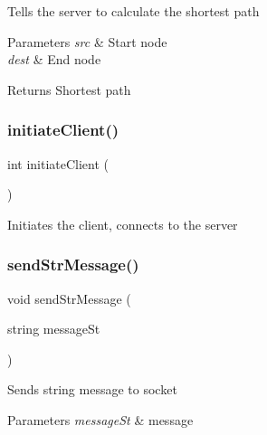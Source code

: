 Tells the server to calculate the shortest path 
\begin{DoxyParams}{Parameters}
{\em src} & Start node \\
\hline
{\em dest} & End node \\
\hline
\end{DoxyParams}
\begin{DoxyReturn}{Returns}
Shortest path 
\end{DoxyReturn}
\mbox{\label{client_8h_a9bdb5cb71771f3cf029e66d99bdbbeca}} 
\subsubsection{initiate\+Client()}
{\footnotesize\ttfamily int initiate\+Client (\begin{DoxyParamCaption}{ }\end{DoxyParamCaption})}

Initiates the client, connects to the server \mbox{\label{client_8h_a6067b6436ed3d55e27cf993a1d346a09}} 
\subsubsection{send\+Str\+Message()}
{\footnotesize\ttfamily void send\+Str\+Message (\begin{DoxyParamCaption}\item[{string}]{message\+St }\end{DoxyParamCaption})}

Sends string message to socket 
\begin{DoxyParams}{Parameters}
{\em message\+St} & message \\
\hline
\end{DoxyParams}
